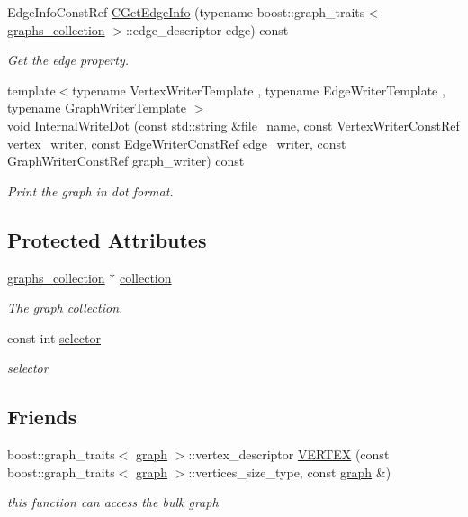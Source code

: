 \begin{DoxyCompactItemize}
Edge\+Info\+Const\+Ref \hyperlink{structgraph_a10996734a9770a28c6ed28d33a10e149}{C\+Get\+Edge\+Info} (typename boost\+::graph\+\_\+traits$<$ \hyperlink{structgraphs__collection}{graphs\+\_\+collection} $>$\+::edge\+\_\+descriptor edge) const
\begin{DoxyCompactList}\small\item\em Get the edge property. \end{DoxyCompactList}\item 
{\footnotesize template$<$typename Vertex\+Writer\+Template , typename Edge\+Writer\+Template , typename Graph\+Writer\+Template $>$ }\\void \hyperlink{structgraph_ab4c93c20c695008b989aae92f637d4e4}{Internal\+Write\+Dot} (const std\+::string \&file\+\_\+name, const Vertex\+Writer\+Const\+Ref vertex\+\_\+writer, const Edge\+Writer\+Const\+Ref edge\+\_\+writer, const Graph\+Writer\+Const\+Ref graph\+\_\+writer) const
\begin{DoxyCompactList}\small\item\em Print the graph in dot format. \end{DoxyCompactList}\end{DoxyCompactItemize}
\subsection*{Protected Attributes}
\begin{DoxyCompactItemize}
\item 
\hyperlink{structgraphs__collection}{graphs\+\_\+collection} $\ast$ \hyperlink{structgraph_a4a6a4f5312ba75fd870ef1e5779deabf}{collection}
\begin{DoxyCompactList}\small\item\em The graph collection. \end{DoxyCompactList}\item 
const int \hyperlink{structgraph_ab06c362711200ca8c15e3d85fef7957b}{selector}
\begin{DoxyCompactList}\small\item\em selector \end{DoxyCompactList}\end{DoxyCompactItemize}
\subsection*{Friends}
\begin{DoxyCompactItemize}
\item 
boost\+::graph\+\_\+traits$<$ \hyperlink{structgraph}{graph} $>$\+::vertex\+\_\+descriptor \hyperlink{structgraph_aa5c4339fe865e05a4ce7a067012a9bb5}{V\+E\+R\+T\+EX} (const boost\+::graph\+\_\+traits$<$ \hyperlink{structgraph}{graph} $>$\+::vertices\+\_\+size\+\_\+type, const \hyperlink{structgraph}{graph} \&)
\begin{DoxyCompactList}\small\item\em this function can access the bulk graph \end{DoxyCompactList}\end{DoxyCompactItemize}


